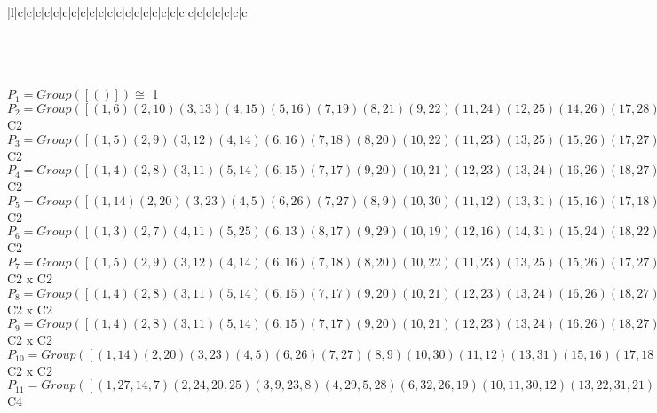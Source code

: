\documentclass[varwidth=\maxdimen,border=10]{standalone}
\begin{document}
\begin{tabular}
\begin{array}{|l|c|c|c|c|c|c|c|c|c|c|c|c|c|c|c|c|c|c|c|c|c|c|c|c|c|c|}
\end{array}\)\\
\ \\
\ \\
$P_{1} = Group( [ () ] )\cong$ 1\ \\
$P_{2} = Group( [ ( 1, 6)( 2,10)( 3,13)( 4,15)( 5,16)( 7,19)( 8,21)( 9,22)(11,24)(12,25)(14,26)(17,28)(18,29)(20,30)(23,31)(27,32) ] )\cong$ C2\ \\
$P_{3} = Group( [ ( 1, 5)( 2, 9)( 3,12)( 4,14)( 6,16)( 7,18)( 8,20)(10,22)(11,23)(13,25)(15,26)(17,27)(19,29)(21,30)(24,31)(28,32) ] )\cong$ C2\ \\
$P_{4} = Group( [ ( 1, 4)( 2, 8)( 3,11)( 5,14)( 6,15)( 7,17)( 9,20)(10,21)(12,23)(13,24)(16,26)(18,27)(19,28)(22,30)(25,31)(29,32) ] )\cong$ C2\ \\
$P_{5} = Group( [ ( 1,14)( 2,20)( 3,23)( 4, 5)( 6,26)( 7,27)( 8, 9)(10,30)(11,12)(13,31)(15,16)(17,18)(19,32)(21,22)(24,25)(28,29) ] )\cong$ C2\ \\
$P_{6} = Group( [ ( 1, 3)( 2, 7)( 4,11)( 5,25)( 6,13)( 8,17)( 9,29)(10,19)(12,16)(14,31)(15,24)(18,22)(20,32)(21,28)(23,26)(27,30) ] )\cong$ C2\ \\
$P_{7} = Group( [ ( 1, 5)( 2, 9)( 3,12)( 4,14)( 6,16)( 7,18)( 8,20)(10,22)(11,23)(13,25)(15,26)(17,27)(19,29)(21,30)(24,31)(28,32), ( 1, 6)( 2,10)( 3,13)( 4,15)( 5,16)( 7,19)( 8,21)( 9,22)(11,24)(12,25)(14,26)(17,28)(18,29)(20,30)(23,31)(27,32) ] )\cong$ C2 x C2\ \\
$P_{8} = Group( [ ( 1, 4)( 2, 8)( 3,11)( 5,14)( 6,15)( 7,17)( 9,20)(10,21)(12,23)(13,24)(16,26)(18,27)(19,28)(22,30)(25,31)(29,32), ( 1, 6)( 2,10)( 3,13)( 4,15)( 5,16)( 7,19)( 8,21)( 9,22)(11,24)(12,25)(14,26)(17,28)(18,29)(20,30)(23,31)(27,32) ] )\cong$ C2 x C2\ \\
$P_{9} = Group( [ ( 1, 4)( 2, 8)( 3,11)( 5,14)( 6,15)( 7,17)( 9,20)(10,21)(12,23)(13,24)(16,26)(18,27)(19,28)(22,30)(25,31)(29,32), ( 1, 5)( 2, 9)( 3,12)( 4,14)( 6,16)( 7,18)( 8,20)(10,22)(11,23)(13,25)(15,26)(17,27)(19,29)(21,30)(24,31)(28,32) ] )\cong$ C2 x C2\ \\
$P_{10} = Group( [ ( 1,14)( 2,20)( 3,23)( 4, 5)( 6,26)( 7,27)( 8, 9)(10,30)(11,12)(13,31)(15,16)(17,18)(19,32)(21,22)(24,25)(28,29), ( 1, 6)( 2,10)( 3,13)( 4,15)( 5,16)( 7,19)( 8,21)( 9,22)(11,24)(12,25)(14,26)(17,28)(18,29)(20,30)(23,31)(27,32) ] )\cong$ C2 x C2\ \\
$P_{11} = Group( [ ( 1,27,14, 7)( 2,24,20,25)( 3, 9,23, 8)( 4,29, 5,28)( 6,32,26,19)(10,11,30,12)(13,22,31,21)(15,18,16,17), ( 1,14)( 2,20)( 3,23)( 4, 5)( 6,26)( 7,27)( 8, 9)(10,30)(11,12)(13,31)(15,16)(17,18)(19,32)(21,22)(24,25)(28,29) ] )\cong$ C4\ \\

\end{tabular}
\end{document}
